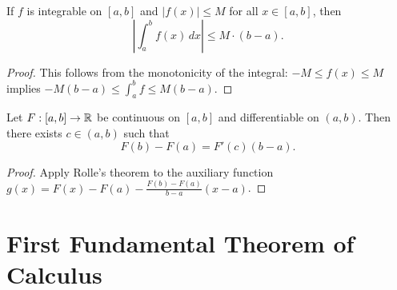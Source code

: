 \begin{lemma}
  \label{lem:integral_bound}
  If $f$ is integrable on $[a,b]$ and $|f(x)| \le M$ for all $x \in [a,b]$, then
  \[
    \left|\int_a^b f(x)\,dx\right| \le M \cdot (b - a).
  \]
\end{lemma}
\begin{proof}
  This follows from the monotonicity of the integral:
  $-M \le f(x) \le M$ implies $-M(b-a) \le \int_a^b f \le M(b-a)$.
\end{proof}

\begin{lemma}
  \label{lem:mean_value_theorem}
  Let $F : [a,b] \to \mathbb{R}$ be continuous on $[a,b]$ and differentiable on $(a,b)$.
  Then there exists $c \in (a,b)$ such that
  \[
    F(b) - F(a) = F'(c)(b - a).
  \]
\end{lemma}
\begin{proof}
  Apply Rolle's theorem to the auxiliary function
  $g(x) = F(x) - F(a) - \frac{F(b)-F(a)}{b-a}(x-a)$.
\end{proof}

\section{First Fundamental Theorem of Calculus}

